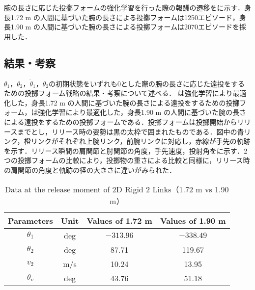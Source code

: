 腕の長さに応じた投擲フォームの強化学習を行った際の報酬の遷移をに示す．身長1.72 m の人間に基づいた腕の長さによる投擲フォームは1250エピソード，身長1.90 m の人間に基づいた腕の長さによる投擲フォームは2070エピソードを採用した．


\subsection{結果・考察}
$\theta_{1}$，$\theta_{2}$，$\dot{\theta}_{1}$，$\dot{\theta}_{2}$の初期状態をいずれも0とした際の腕の長さに応じた遠投をするための投擲フォーム戦略の結果・考察について述べる．
は強化学習により最適化した，身長1.72 m の人間に基づいた腕の長さによる遠投をするための投擲フォーム，は強化学習により最適化した，身長1.90 m の人間に基づいた腕の長さによる遠投をするための投擲フォームである．投擲フォームは投擲開始からリリースまでとし，リリース時の姿勢は黒の太枠で囲まれたものである．図中の青リンク，橙リンクがそれぞれ上腕リンク，前腕リンクに対応し，赤線が手先の軌跡を示す．リリース瞬間の肩関節と肘関節の角度，手先速度，投射角をに示す．2つの投擲フォームの比較により，投擲物の重さによる比較と同様に，リリース時の肩関節の角度と軌跡の径の大きさに違いがみられた．

\begin{table}[tb]
  \begin{center}
    \caption{Data at the release moment of 2D Rigid 2 Links（1.72 m vs 1.90 m）}
    \begin{tabular}{c|c|c|c}
      \hline
      Parameters & Unit & Values of 1.72 m & Values of 1.90 m \\
      \hline
      $\theta_{1}$ & deg & $-313.96$ & $-338.49$ \\
      $\theta_{2}$ & deg & 87.71 & 119.67 \\
      $v_{2}$ & m/s & 10.24 & 13.95 \\
      $\theta_{v}$ & deg & 43.76 & 51.18 \\
      \hline
    \end{tabular}
  \end{center}
\end{table}


